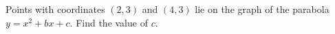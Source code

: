 Points with coordinates $(2,3)$ and $(4,3)$ lie on the graph of the parabola $y=x^{2}+bx+c$. Find the value of $c$.
